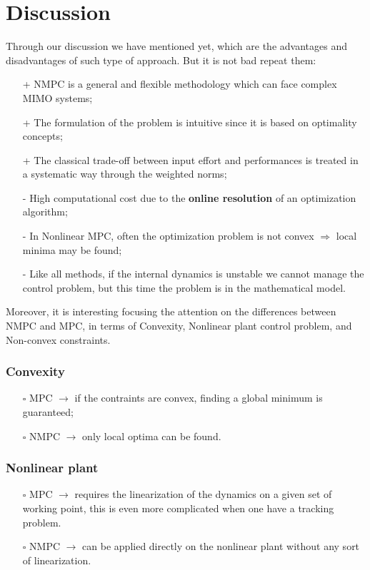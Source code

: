 \section{Discussion}
Through our discussion we have mentioned yet, which are the advantages and disadvantages of such type of approach. But it is not bad repeat them: 
\begin{itemize}
    \item[+] NMPC is a general and flexible methodology which can face complex MIMO systems; 
    \item[+] The formulation of the problem is intuitive since it is based on optimality concepts; 
    \item[+] The classical trade-off between input effort and performances is treated in a systematic way through the weighted norms; 
    \item[-] High computational cost due to the \textbf{online resolution} of an optimization algorithm; 
    \item[-] In Nonlinear MPC, often the optimization problem is not convex $\Longrightarrow$ local minima may be found; 
    \item[-] Like all methods, if the internal dynamics is unstable we cannot manage the control problem, but this time the problem is in the mathematical model.    
\end{itemize}

Moreover, it is interesting focusing the attention on the differences between NMPC and MPC, in terms of Convexity, Nonlinear plant control problem, and Non-convex constraints.

\subsubsection{Convexity}
\begin{itemize}
    \itemsep 0em
    \item[$\square$] MPC $\rightarrow$ if the contraints are convex, finding a global  minimum is guaranteed; 
    \item[$\square$] NMPC $\rightarrow$ only local optima can be found.
\end{itemize}

\subsubsection{Nonlinear plant}
\begin{itemize}
    \itemsep 0em
    \item[$\square$] MPC $\rightarrow$ requires the linearization of the dynamics on a given set of working point, this is even more complicated when one have a tracking problem.
    \item[$\square$] NMPC $\rightarrow$ can be applied directly on the nonlinear plant without any sort of linearization.
\end{itemize}

